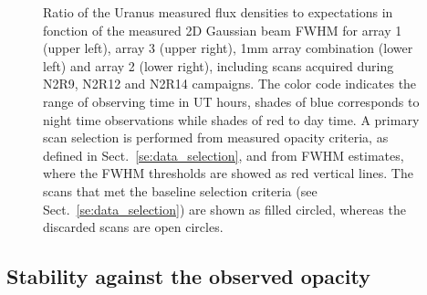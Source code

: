 \begin{figure}[ht!]
\begin{center}
\caption[Uranus flux density stability against FWHM]{Ratio of the
  Uranus measured flux densities to expectations in fonction of the
  measured 2D
  Gaussian beam FWHM for array 1 (upper left), array 3 (upper right),
  1mm array combination (lower left) and array 2 (lower right),
  including scans acquired during N2R9, N2R12 and N2R14 campaigns. The
  color code indicates the range of observing time in UT hours, shades
  of blue corresponds to night time observations while shades of red
  to day time. A primary scan selection is performed from measured
  opacity criteria, as defined in Sect.~\ref{se:data_selection}, and
  from FWHM estimates, where the FWHM thresholds are showed as red vertical
  lines. The scans that met the baseline selection criteria (see
  Sect.~\ref{se:data_selection})
  are shown as filled circled, whereas the discarded scans are open circles.}
\label{fig:calib_uranus_vs_fwhm_all}
\end{center}
\end{figure}


\subsection{Stability against the observed opacity}


